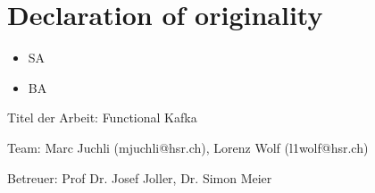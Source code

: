 \chapter{Declaration of originality}

\begin{itemize}
    \item SA 
    \item BA 
\end{itemize}

Titel der Arbeit: Functional Kafka 

Team: Marc Juchli (mjuchli@hsr.ch), Lorenz Wolf (l1wolf@hsr.ch)

Betreuer: Prof Dr. Josef Joller, Dr. Simon Meier 



